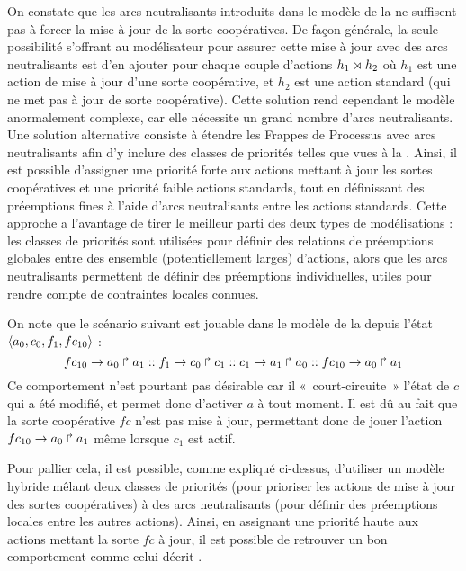 On constate que les arcs neutralisants introduits dans le modèle de la 
ne suffisent pas à forcer la mise à jour de la sorte coopératives.
De façon générale, la seule possibilité s'offrant au modélisateur pour assurer cette mise à jour
avec des arcs neutralisants est d'en ajouter pour chaque couple d'actions $h_1\rtimes h_2$
où $h_1$ est une action de mise à jour d'une sorte coopérative,
et $h_2$ est une action standard (qui ne met pas à jour de sorte coopérative).
Cette solution rend cependant le modèle anormalement complexe,
car elle nécessite un grand nombre d'arcs neutralisants.
Une solution alternative consiste à étendre les Frappes de Processus avec arcs neutralisants
afin d'y inclure des classes de priorités telles que vues à la .
Ainsi, il est possible d'assigner une priorité forte aux actions mettant à jour
les sortes coopératives et une priorité faible actions standards,
tout en définissant des préemptions fines à l'aide d'arcs neutralisants entre
les actions standards.
Cette approche a l'avantage de tirer le meilleur parti des deux types de modélisations :
les classes de priorités sont utilisées pour définir des relations de préemptions
globales entre des ensemble (potentiellement larges) d'actions,
alors que les arcs neutralisants permettent de définir des préemptions individuelles,
utiles pour rendre compte de contraintes locales connues.

\begin{example}
  On note que le scénario suivant est jouable dans le modèle de la 
  depuis l'état $\mbox{$\langle a_0, c_0, f_1, fc_{10} \rangle$}$ :
  \[fc_{10}\rightarrow a_0\Rsh a_1 ::
    f_1\rightarrow c_0\Rsh c_1 ::
    c_1\rightarrow a_1\Rsh a_0 ::
    fc_{10}\rightarrow a_0\Rsh a_1\]
  Ce comportement n'est pourtant pas désirable car il «~court-circuite~»
  l'état de $c$ qui a été modifié, et permet donc d'activer $a$ à tout moment.
  Il est dû au fait que la sorte coopérative $fc$ n'est pas mise à jour,
  permettant donc de jouer l'action $fc_{10}\rightarrow a_0\Rsh a_1$ même lorsque $c_1$ est actif.
  
  Pour pallier cela, il est possible, comme expliqué ci-dessus, d'utiliser un modèle hybride
  mêlant deux classes de priorités (pour prioriser les actions de mise à jour des sortes
  coopératives) à des arcs neutralisants (pour définir des préemptions locales entre les
  autres actions).
  Ainsi, en assignant une priorité haute aux actions mettant la sorte $fc$ à jour,
  il est possible de retrouver un bon comportement comme celui décrit .
\end{example}



